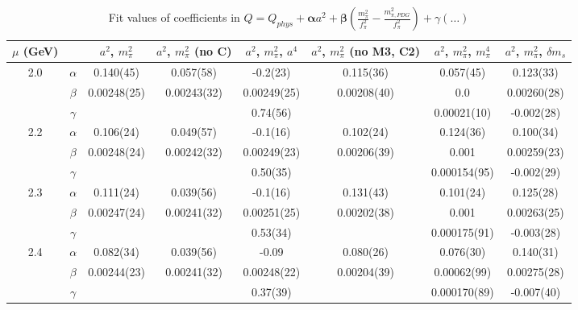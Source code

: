 \documentclass[12pt]{extarticle}
\begin{document}
\begin{table}[h!]
\begin{center}
\begin{tabular}{|c c|c|c|c|c|c|c|}
\hline
$\mu$ (GeV) &  & $a^2$, $m_\pi^2$& $a^2$, $m_\pi^2$ (no C)& $a^2$, $m_\pi^2$, $a^4$& $a^2$, $m_\pi^2$ (no M3, C2)& $a^2$, $m_\pi^2$, $m_\pi^4$& $a^2$, $m_\pi^2$, $\delta m_s$\\
\hline
\multirow{3}{0.5in}{2.0} & $\alpha$ & 0.140(45)& 0.057(58)& -0.2(23)& 0.115(36)& 0.057(45)& 0.123(33)\\
 & $\beta$ & 0.00248(25)& 0.00243(32)& 0.00249(25)& 0.00208(40)& 0.0& 0.00260(28)\\
 & $\gamma$ &  &  & 0.74(56)&  & 0.00021(10)& -0.002(28)\\
\hline
\multirow{3}{0.5in}{2.2} & $\alpha$ & 0.106(24)& 0.049(57)& -0.1(16)& 0.102(24)& 0.124(36)& 0.100(34)\\
 & $\beta$ & 0.00248(24)& 0.00242(32)& 0.00249(23)& 0.00206(39)& 0.001& 0.00259(23)\\
 & $\gamma$ &  &  & 0.50(35)&  & 0.000154(95)& -0.002(29)\\
\hline
\multirow{3}{0.5in}{2.3} & $\alpha$ & 0.111(24)& 0.039(56)& -0.1(16)& 0.131(43)& 0.101(24)& 0.125(28)\\
 & $\beta$ & 0.00247(24)& 0.00241(32)& 0.00251(25)& 0.00202(38)& 0.001& 0.00263(25)\\
 & $\gamma$ &  &  & 0.53(34)&  & 0.000175(91)& -0.003(28)\\
\hline
\multirow{3}{0.5in}{2.4} & $\alpha$ & 0.082(34)& 0.039(56)& -0.09& 0.080(26)& 0.076(30)& 0.140(31)\\
 & $\beta$ & 0.00244(23)& 0.00241(32)& 0.00248(22)& 0.00204(39)& 0.00062(99)& 0.00275(28)\\
 & $\gamma$ &  &  & 0.37(39)&  & 0.000170(89)& -0.007(40)\\
\hline
\end{tabular}
\caption{Fit values of coefficients in $Q = Q_{phys} + \mathbf{\alpha} a^2 + \mathbf{\beta}\left(\frac{m_\pi^2}{f_\pi^2}-\frac{m_{\pi,PDG}^2}{f_\pi^2}\right) + \gamma(\ldots)$}
\end{center}
\end{table}







\end{document}
